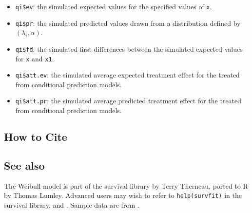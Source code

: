 \begin{itemize}
   \begin{itemize}
   \item {\tt qi\$ev}: the simulated expected values for the specified
     values of {\tt x}.
   \item {\tt qi\$pr}: the simulated predicted values drawn from a
     distribution defined by $(\lambda_i, \alpha)$.  
   \item {\tt qi\$fd}: the simulated first differences between the
     simulated expected values for {\tt x} and {\tt x1}.  
   \item {\tt qi\$att.ev}: the simulated average expected treatment
     effect for the treated from conditional prediction models.  
   \item {\tt qi\$att.pr}: the simulated average predicted treatment
     effect for the treated from conditional prediction models.  
   \end{itemize}
\end{itemize}

\subsection* {How to Cite} 




\subsection* {See also}
The Weibull model is part of the survival library by Terry Therneau,
ported to R by Thomas Lumley.  Advanced users may wish to refer to
\texttt{help(survfit)} in the survival library, and \cite{VenRip02}.
Sample data are from \cite{KinAltBur90}.
